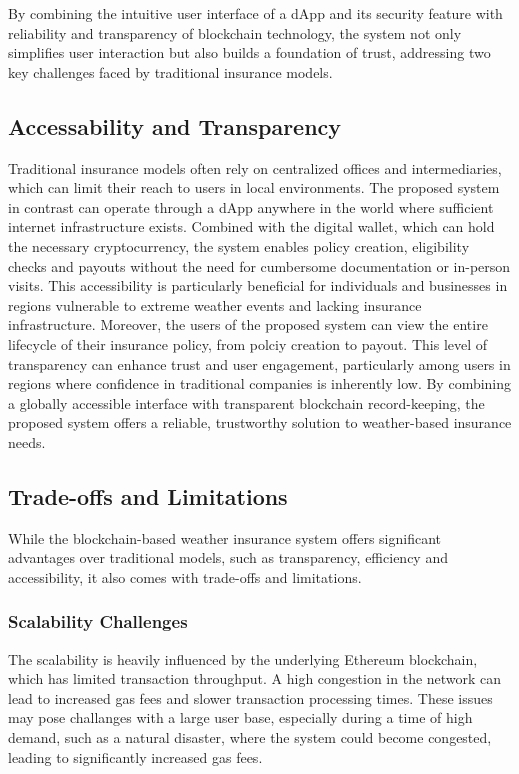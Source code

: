 By combining the intuitive user interface of a dApp and its security feature with reliability and transparency of blockchain technology, the system not only simplifies user interaction but also builds a foundation of trust, addressing two key challenges faced by traditional insurance models. 

\subsection{Accessability and Transparency}\label{accessibility_transparency}
Traditional insurance models often rely on centralized offices and intermediaries, which can limit their reach to users in local environments. The proposed system in contrast can operate through a dApp anywhere in the world where sufficient internet infrastructure exists. Combined with the digital wallet, which can hold the necessary cryptocurrency, the system enables policy creation, eligibility checks and payouts without the need for cumbersome documentation or in-person visits. This accessibility is particularly beneficial for individuals and businesses in regions vulnerable to extreme weather events and lacking insurance infrastructure. Moreover, the users of the proposed system can view the entire lifecycle of their insurance policy, from polciy creation to payout. This level of transparency can enhance trust and user engagement, particularly among users in regions where confidence in traditional companies is inherently low. By combining a globally accessible interface with transparent blockchain record-keeping, the proposed system offers a reliable, trustworthy solution to weather-based insurance needs.

\subsection{Trade-offs and Limitations}
While the blockchain-based weather insurance system offers significant advantages over traditional models, such as transparency, efficiency and accessibility, it also comes with trade-offs and limitations.

\subsubsection{Scalability Challenges}
The scalability is heavily influenced by the underlying Ethereum blockchain, which has limited transaction throughput. A high congestion in the network can lead to increased gas fees and slower transaction processing times. These issues may pose challanges with a large user base, especially during a time of high demand, such as a natural disaster, where the system could become congested, leading to significantly increased gas fees.

